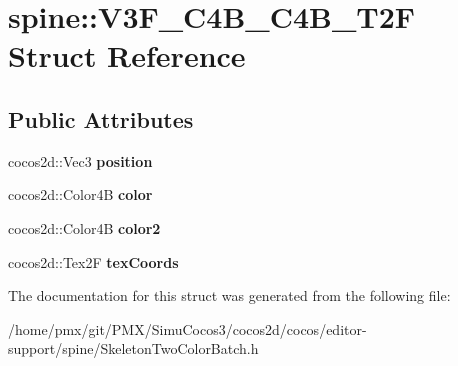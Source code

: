 \hypertarget{structspine_1_1V3F__C4B__C4B__T2F}{}\section{spine\+:\+:V3\+F\+\_\+\+C4\+B\+\_\+\+C4\+B\+\_\+\+T2F Struct Reference}
\label{structspine_1_1V3F__C4B__C4B__T2F}
\subsection*{Public Attributes}
\begin{DoxyCompactItemize}
\item 
\mbox{\label{structspine_1_1V3F__C4B__C4B__T2F_a8c6c8b356b579035592d3519fabe78d7}} 
cocos2d\+::\+Vec3 {\bfseries position}
\item 
\mbox{\label{structspine_1_1V3F__C4B__C4B__T2F_abded04aa81a20312980a01baddefc707}} 
cocos2d\+::\+Color4B {\bfseries color}
\item 
\mbox{\label{structspine_1_1V3F__C4B__C4B__T2F_ad64aef25ecdf9a9fc91f32dd51d6ede1}} 
cocos2d\+::\+Color4B {\bfseries color2}
\item 
\mbox{\label{structspine_1_1V3F__C4B__C4B__T2F_ab10a35e4994beb49144faa487f6db2d7}} 
cocos2d\+::\+Tex2F {\bfseries tex\+Coords}
\end{DoxyCompactItemize}


The documentation for this struct was generated from the following file\+:\begin{DoxyCompactItemize}
\item 
/home/pmx/git/\+P\+M\+X/\+Simu\+Cocos3/cocos2d/cocos/editor-\/support/spine/Skeleton\+Two\+Color\+Batch.\+h\end{DoxyCompactItemize}
